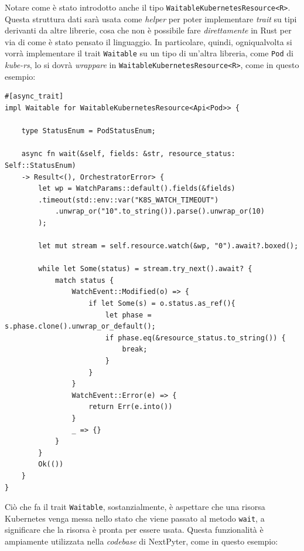 Notare come è stato introdotto anche il tipo \verb|WaitableKubernetesResource<R>|. Questa struttura dati sarà usata come \textit{helper} per poter implementare \textit{trait} su tipi derivanti da altre librerie, cosa che non è possibile fare \textit{direttamente} in Rust per via di come è stato pensato il linguaggio. In particolare, quindi, ogniqualvolta si vorrà implementare il trait \verb|Waitable| su un tipo di un'altra libreria, come \verb|Pod| di \textit{kube-rs}, lo si dovrà \textit{wrappare} in \verb|WaitableKubernetesResource<R>|, come in questo esempio:
\begin{verbatim}
#[async_trait]
impl Waitable for WaitableKubernetesResource<Api<Pod>> {

    type StatusEnum = PodStatusEnum;

    async fn wait(&self, fields: &str, resource_status: Self::StatusEnum)
    -> Result<(), OrchestratorError> {
        let wp = WatchParams::default().fields(&fields)
        .timeout(std::env::var("K8S_WATCH_TIMEOUT")
            .unwrap_or("10".to_string()).parse().unwrap_or(10)
        );

        let mut stream = self.resource.watch(&wp, "0").await?.boxed();

        while let Some(status) = stream.try_next().await? {
            match status {
                WatchEvent::Modified(o) => {
                    if let Some(s) = o.status.as_ref(){
                        let phase = s.phase.clone().unwrap_or_default();
                        if phase.eq(&resource_status.to_string()) {
                            break;
                        }
                    }
                }
                WatchEvent::Error(e) => {
                    return Err(e.into())
                }
                _ => {}
            }
        }
        Ok(())
    }
}

\end{verbatim}
Ciò che fa il trait \verb|Waitable|, sostanzialmente, è aspettare che una risorsa Kubernetes venga messa nello stato che viene passato al metodo \verb|wait|, a significare che la risorsa è pronta per essere usata.
\newline
Questa funzionalità è ampiamente utilizzata nella \textit{codebase} di NextPyter, come in questo esempio:

